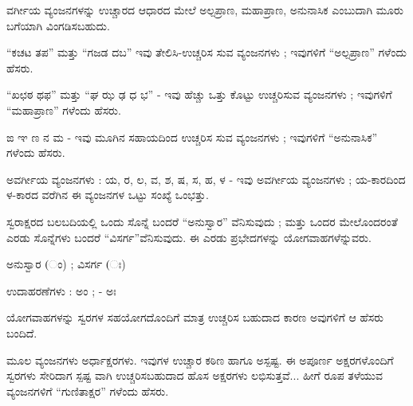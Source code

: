 \begin{kbvrule}
\noindent\kbvbullet\hspace{0.5em}ವರ್ಗೀಯ ವ್ಯಂಜನಗಳನ್ನು ಉಚ್ಚಾರದ ಆಧಾರದ ಮೇಲೆ ಅಲ್ಪಪ್ರಾಣ, ಮಹಾಪ್ರಾಣ, ಅನುನಾಸಿಕ ಎಂಬುದಾಗಿ ಮೂರು ಬಗೆಯಾಗಿ ವಿಂಗಡಿಸಬಹುದು.
\end{kbvrule}

\vspace{2.5pt plus 3pt minus 0.5pt}\noindent\hspace*{1.2em}\hspace{0.55em}“ಕಚಟ ತಪ” ಮತ್ತು “ಗಜಡ ದಬ” ಇವು ತೇಲಿಸಿ-ಉಚ್ಚರಿಸ ಸುವ ವ್ಯಂಜನಗಳು ; ಇವುಗಳಿಗೆ “ಅಲ್ಪಪ್ರಾಣ” ಗಳೆಂದು ಹೆಸರು.\par

\vspace{2.5pt plus 3pt minus 0.5pt}\noindent\hspace*{1.2em}\hspace{0.55em}“ಖಛಠ ಥಫ” ಮತ್ತು “ಘ ಝ ಢ ಧ ಭ” - ಇವು ಹೆಚ್ಚು ಒತ್ತು ಕೊಟ್ಟು ಉಚ್ಚರಿಸುವ ವ್ಯಂಜನಗಳು ; ಇವುಗಳಿಗೆ “ಮಹಾಪ್ರಾಣ” ಗಳೆಂದು ಹೆಸರು.\par

\vspace{2.5pt plus 3pt minus 0.5pt}\noindent\hspace*{1.2em}\hspace{0.55em}ಙ ಞ ಣ ನ ಮ - ಇವು ಮೂಗಿನ ಸಹಾಯದಿಂದ ಉಚ್ಚರಿಸ ಸುವ ವ್ಯಂಜನಗಳು ; ಇವುಗಳಿಗೆ “ಅನುನಾಸಿಕ” ಗಳೆಂದು ಹೆಸರು.\par

\begin{kbvrule}
\noindent\kbvbullet\hspace{0.5em}ಅವರ್ಗೀಯ ವ್ಯಂಜನಗಳು : ಯ, ರ, ಲ, ವ, ಶ, ಷ, ಸ, ಹ, ಳ - ಇವು ಅವರ್ಗೀಯ ವ್ಯಂಜನಗಳು ; ಯ-ಕಾರದಿಂದ ಳ-ಕಾರದ ವರೆಗಿನ ಈ ವ್ಯಂಜನಗಳ ಒಟ್ಟು ಸಂಖ್ಯೆ ಒಂಭತ್ತು.
\end{kbvrule}


\indent ಸ್ವರಾಕ್ಷರದ ಬಲಬದಿಯಲ್ಲಿ ಒಂದು ಸೊನ್ನೆ ಬಂದರೆ “ಅನುಸ್ವಾರ” ವೆನಿಸುವುದು ; ಮತ್ತು ಒಂದರ ಮೇಲೊಂದರಂತೆ ಎರಡು ಸೊನ್ನೆಗಳು ಬಂದರೆ “ವಿಸರ್ಗ”ವೆನಿಸುವುದು. ಈ ಎರಡು ಪ್ರಭೇದಗಳನ್ನು ಯೋಗವಾಹಗಳೆನ್ನುವರು.\par

\indent ಅನುಸ್ವಾರ (ಂ) ; ವಿಸರ್ಗ (ಃ)\par

\indent ಉದಾಹರಣೆಗಳು : ಅಂ ; - ಅಃ\par

\indent ಯೋಗವಾಹಗಳನ್ನು ಸ್ವರಗಳ ಸಹಯೋಗದೊಂದಿಗೆ ಮಾತ್ರ ಉಚ್ಚರಿಸ ಬಹುದಾದ ಕಾರಣ ಅವುಗಳಿಗೆ ಆ ಹೆಸರು ಬಂದಿದೆ.\par


\indent ಮೂಲ ವ್ಯಂಜನಗಳು ಅರ್ಧಾಕ್ಷರಗಳು. ಇವುಗಳ ಉಚ್ಚಾರ ಕಠಿಣ ಹಾಗೂ ಅಸ್ಪಷ್ಟ. ಈ ಅಪೂರ್ಣ ಅಕ್ಷರಗಳೊಂದಿಗೆ ಸ್ವರಗಳು ಸೇರಿದಾಗ ಸ್ಪಷ್ಟ ವಾಗಿ ಉಚ್ಚರಿಸಬಹುದಾದ ಹೊಸ ಅಕ್ಷರಗಳು ಲಭಿಸುತ್ತವೆ... ಹೀಗೆ ರೂಪ ತಳೆಯುವ ವ್ಯಂಜನಗಳಿಗೆ “ಗುಣಿತಾಕ್ಷರ” ಗಳೆಂದು ಹೆಸರು.\par
